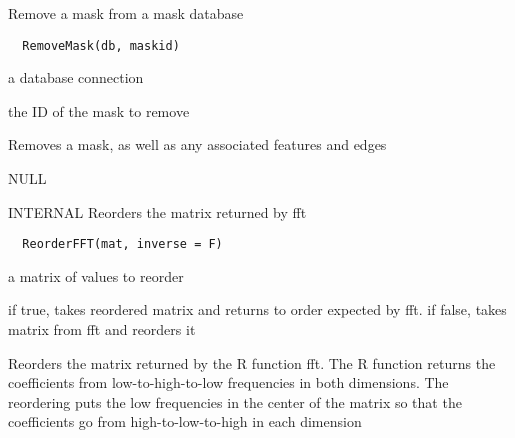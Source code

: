 \documentclass[a4paper]{book}
\begin{document}
%
\begin{Description}\relax
Remove a mask from a mask database
\end{Description}
%
\begin{Usage}
\begin{verbatim}
  RemoveMask(db, maskid)
\end{verbatim}
\end{Usage}
%
\begin{Arguments}
\begin{ldescription}
\item[\code{db}] a database connection

\item[\code{maskid}] the ID of the mask to remove
\end{ldescription}
\end{Arguments}
%
\begin{Details}\relax
Removes a mask, as well as any associated features and
edges
\end{Details}
%
\begin{Value}
NULL
\end{Value}
%
\begin{Description}\relax
INTERNAL Reorders the matrix returned by fft
\end{Description}
%
\begin{Usage}
\begin{verbatim}
  ReorderFFT(mat, inverse = F)
\end{verbatim}
\end{Usage}
%
\begin{Arguments}
\begin{ldescription}
\item[\code{mat}] a matrix of values to reorder

\item[\code{inverse}] if true, takes reordered matrix and
returns to order expected by fft. if false, takes matrix
from fft and reorders it
\end{ldescription}
\end{Arguments}
%
\begin{Details}\relax
Reorders the matrix returned by the R function fft.  The
R function returns the coefficients from
low-to-high-to-low frequencies in both dimensions.  The
reordering puts the low frequencies in the center of the
matrix so that the coefficients go from
high-to-low-to-high in each dimension
\end{Details}
\end{document}
